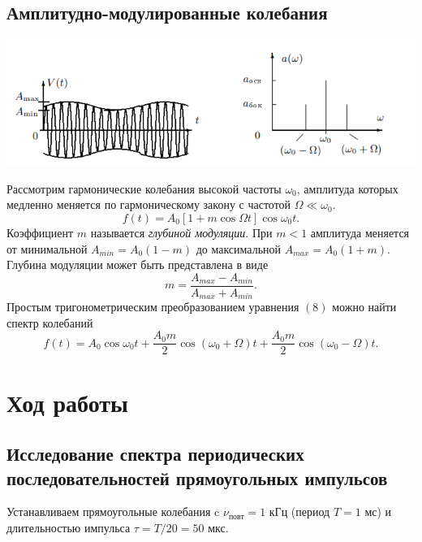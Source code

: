 \documentclass[a4paper,12pt]{article}
\begin{document}
\subsection*{Амплитудно-модулированные колебания}
\begin{center}
\includegraphics[scale=0.9]{4.png}
\end{center}
Рассмотрим гармонические колебания высокой частоты $\omega_0$, амплитуда которых медленно меняется по гармоническому закону с частотой $\Omega \ll \omega_0$.
\begin{equation}
f(t) = A_0 \left[1+m\cos \Omega t\right] \cos \omega_0 t.
\end{equation}
Коэффициент $m$ называется \textit{глубиной модуляции}. При $m < 1$ амплитуда меняется от минимальной $A_{min} = A_0(1-m)$ до максимальной $A_{max} = A_0(1+m)$. Глубина модуляции может быть представлена в виде
\begin{equation}
m = \dfrac{A_{max}-A_{min}}{A_{max}+A_{min}}.
\end{equation}
Простым тригонометрическим преобразованием уравнения $(8)$ можно найти спектр колебаний
\begin{equation}
f(t) = A_0 \cos \omega_0t + \dfrac{A_0m}{2} \cos \left(\omega_0 + \Omega\right)t + \dfrac{A_0m}{2}\cos\left(\omega_0 - \Omega\right)t.
\end{equation}
\section*{Ход работы}
 \subsection*{Исследование спектра периодических последовательностей прямоугольных импульсов}
Устанавливаем прямоугольные колебания c $\nu_{\text{повт}} = 1$ кГц (период $T = 1$ мс) и длительностью импульса $\tau = T/20 = 50$ мкс.
\end{document}
